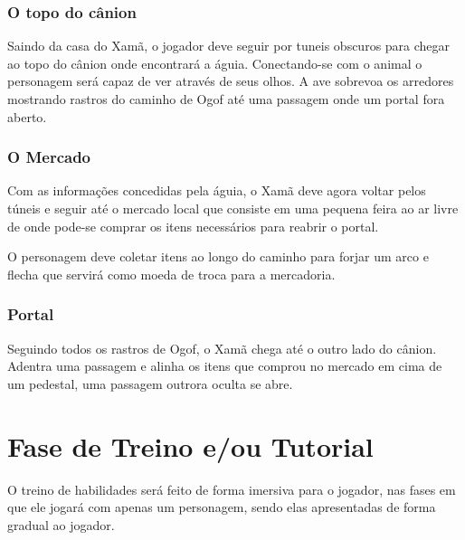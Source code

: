 \subsubsection{O topo do cânion}
Saindo da casa do Xamã, o jogador deve seguir por tuneis obscuros para chegar ao topo do cânion onde encontrará a águia. Conectando-se com o animal o personagem será capaz de ver através de seus olhos. A ave sobrevoa os arredores mostrando rastros do caminho de Ogof até uma passagem onde um portal fora aberto.

\subsubsection{O Mercado}
Com as informações concedidas pela águia, o Xamã deve agora voltar pelos túneis e seguir até o mercado local que consiste em uma pequena feira ao ar livre de onde pode-se comprar os itens necessários para reabrir o portal.

O personagem deve coletar itens ao longo do caminho para forjar um arco e flecha que servirá como moeda de troca para a mercadoria.

\subsubsection{Portal}
Seguindo todos os rastros de Ogof, o Xamã chega até o outro lado do cânion. Adentra uma passagem e alinha os itens que comprou no mercado em cima de um pedestal, uma passagem outrora oculta se abre.

\section{Fase de Treino e/ou Tutorial}

O treino de habilidades será feito de forma imersiva para o jogador, nas fases em que ele jogará com apenas um personagem, sendo elas apresentadas de forma gradual ao jogador.
